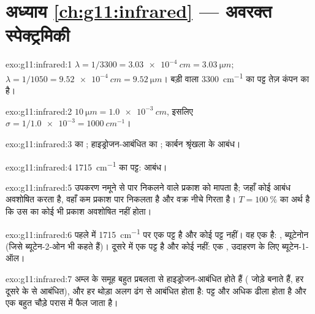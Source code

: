 \section*{अध्याय \ref{ch:g11:infrared} --- अवरक्त स्पेक्ट्रमिकी}

\begin{solution}{exo:g11:infrared:1}
$\lambda = 1/3300 = \qty{3.03e-4}{cm} = \qty{3.03}{\micro m}$;
$\lambda = 1/1050 = \qty{9.52e-4}{cm} = \qty{9.52}{\micro m}$। बड़ी 
वाला \qty{3300}{cm^{-1}} का पट्ट तेज़ कंपन का है।
\end{solution}

\begin{solution}{exo:g11:infrared:2}
$\qty{10}{\micro m} = \qty{1.0e-3}{cm}$, इसलिए $\sigma = 1/\num{1.0e-3} =
\qty{1000}{cm^{-1}}$।
\end{solution}

\begin{solution}{exo:g11:infrared:3}
 का ; हाइड्रोजन-आबंधित  का ; कार्बन श्रृंखला के
 आबंध।
\end{solution}

\begin{solution}{exo:g11:infrared:4}
\qty{1715}{cm^{-1}} का पट्ट:  आबंध।
\end{solution}

\begin{solution}{exo:g11:infrared:5}
उपकरण नमूने से पार निकलने वाले प्रकाश को मापता है; जहाँ कोई
आबंध अवशोषित करता है, वहाँ कम प्रकाश पार निकलता है और वक्र नीचे गिरता है। $T =
\qty{100}{\percent}$ का अर्थ है कि उस  का कोई भी प्रकाश
अवशोषित नहीं होता।
\end{solution}

\begin{solution}{exo:g11:infrared:6}
पहले में \qty{1715}{cm^{-1}} पर एक  पट्ट है और कोई 
पट्ट नहीं। वह एक  है: , ब्यूटेनोन (जिसे
ब्यूटेन-2-ओन भी कहते हैं)। दूसरे में एक  पट्ट है और कोई  नहीं: एक
, उदाहरण के लिए ब्यूटेन-1-ऑल।
\end{solution}

\begin{solution}{exo:g11:infrared:7}
अम्ल के  समूह बहुत प्रबलता से हाइड्रोजन-आबंधित होते हैं (
जोड़े बनाते हैं, हर  दूसरे के  से आबंधित),
और हर  थोड़ा अलग ढंग से आबंधित होता है: पट्ट और अधिक ढीला होता है
और एक बहुत चौड़े परास में फैल जाता है।
\end{solution}

